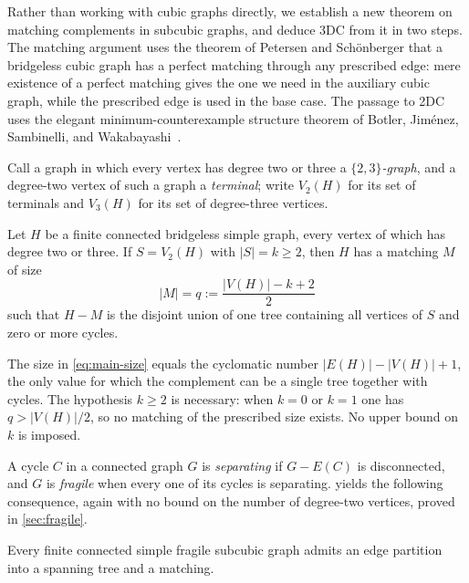 \documentclass[a4paper,11pt]{article}
\newcommand{\abs}[1]{\left\lvert#1\right\rvert}
\newcommand{\Vtwo}{V_2}                      %
\newcommand{\Vthree}{V_3}                     %
\numberwithin{equation}{section}
\begin{document}
Rather than working with cubic graphs directly, we establish a new theorem on
matching complements in subcubic graphs, and deduce 3DC from it in two steps.
The matching argument uses the theorem of Petersen and Sch\"onberger that a
bridgeless cubic graph has a perfect matching through any prescribed edge: mere
existence of a perfect matching gives the one we need in the auxiliary cubic
graph, while the prescribed edge is used in the base case. The
passage to 2DC uses the elegant minimum-counterexample structure theorem of
Botler, Jim\'enez, Sambinelli, and
Wakabayashi~\cite{BotlerJimenezSambinelliWakabayashi2024}.

Call a graph in which every vertex has degree two or three a
\emph{$\{2,3\}$-graph}, and a degree-two vertex of such a graph a
\emph{terminal}; write $\Vtwo(H)$ for its set of terminals and $\Vthree(H)$ for
its set of degree-three vertices.

\begin{theorem}\label{thm:terminal-selection}
  Let $H$ be a finite connected bridgeless simple graph, every vertex of which
  has degree two or three. If $S=\Vtwo(H)$ with $\abs{S}=k\ge 2$, then $H$ has a
  matching $M$ of size
  \begin{equation}\label{eq:main-size}
    \abs{M}=q:=\frac{\abs{V(H)}-k+2}{2}
  \end{equation}
  such that $H-M$ is the disjoint union of one tree containing all vertices of
  $S$ and zero or more cycles.
\end{theorem}

The size in \cref{eq:main-size} equals the cyclomatic number
$\abs{E(H)}-\abs{V(H)}+1$, the only value for which the complement can be a
single tree together with cycles. The hypothesis $k\ge 2$ is necessary: when
$k=0$ or $k=1$ one has $q>\abs{V(H)}/2$, so no matching of the prescribed size
exists. No upper bound on $k$ is imposed.

A cycle $C$ in a connected graph $G$ is \emph{separating} if $G-E(C)$ is
disconnected, and $G$ is \emph{fragile} when every one of its cycles is
separating.  yields the following consequence,
again with no bound on the number of degree-two vertices, proved in
\cref{sec:fragile}.

\begin{theorem}\label{thm:simple-fragile}
  Every finite connected simple fragile subcubic graph admits an edge partition
  into a spanning tree and a matching.
\end{theorem}
\end{document}

